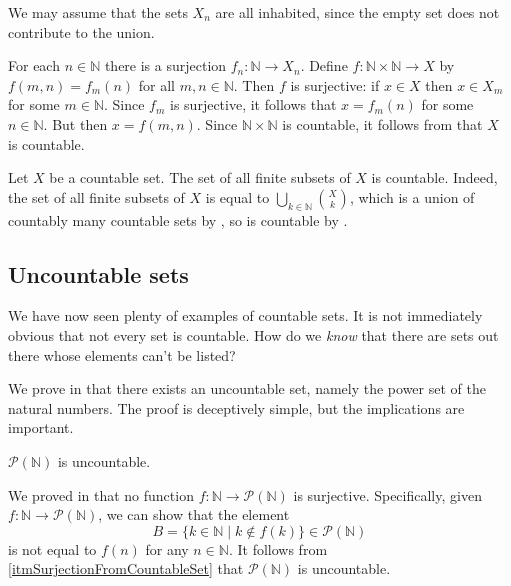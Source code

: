 \begin{cproof}
We may assume that the sets $X_n$ are all inhabited, since the empty set does not contribute to the union.

For each $n \in \mathbb{N}$ there is a surjection $f_n : \mathbb{N} \to X_n$. Define $f : \mathbb{N} \times \mathbb{N} \to X$ by $f(m,n)=f_m(n)$ for all $m,n \in \mathbb{N}$. Then $f$ is surjective: if $x \in X$ then $x \in X_m$ for some $m \in \mathbb{N}$. Since $f_m$ is surjective, it follows that $x=f_m(n)$ for some $n \in \mathbb{N}$. But then $x=f(m,n)$. Since $\mathbb{N} \times \mathbb{N}$ is countable, it follows from  that $X$ is countable.
\end{cproof}

\begin{example}
\label{exCountableSubsetsOfCountableSetIsCountable}
Let $X$ be a countable set. The set of all finite subsets of $X$ is countable. Indeed, the set of all finite subsets of $X$ is equal to $\displaystyle \bigcup_{k \in \mathbb{N}} \binom{X}{k}$, which is a union of countably many countable sets by , so is countable by .
\end{example}

\subsection*{Uncountable sets}

We have now seen plenty of examples of countable sets. It is not immediately obvious that not every set is countable. How do we \textit{know} that there are sets out there whose elements can't be listed?

We prove in  that there exists an uncountable set, namely the power set of the natural numbers. The proof is deceptively simple, but the implications are important.

\begin{theorem}
\label{thmCantorForN}
$\mathcal{P}(\mathbb{N})$ is uncountable.
\end{theorem}

\begin{cproof}
We proved in  that no function $f : \mathbb{N} \to \mathcal{P}(\mathbb{N})$ is surjective. Specifically, given $f : \mathbb{N} \to \mathcal{P}(\mathbb{N})$, we can show that the element
\[ B = \{ k \in \mathbb{N} \mid k \not\in f(k) \} \in \mathcal{P}(\mathbb{N}) \]
is not equal to $f(n)$ for any $n \in \mathbb{N}$. It follows from \ref{itmSurjectionFromCountableSet} that $\mathcal{P}(\mathbb{N})$ is uncountable.
\end{cproof}

